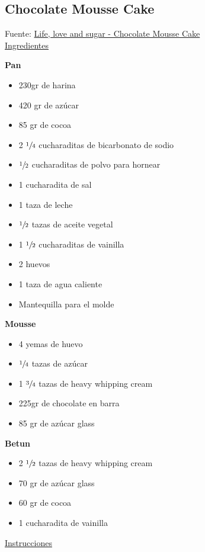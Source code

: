\subsection{Chocolate Mousse Cake}

Fuente: \href{https://www.lifeloveandsugar.com/2017/10/23/chocolate-mousse-cake/}{Life, love and sugar - Chocolate Mousse Cake}\\

\underline{Ingredientes}

\textbf{Pan}
\begin{itemize}
\item 230gr de harina
\item 420 gr de azúcar
\item 85 gr de cocoa
\item 2 $\sfrac{1}{4}$ cucharaditas de bicarbonato de sodio
\item $\sfrac{1}{2}$ cucharaditas de polvo para hornear
\item 1 cucharadita de sal
\item 1 taza de leche
\item $\sfrac{1}{2}$ tazas de aceite vegetal
\item 1 $\sfrac{1}{2}$ cucharaditas de vainilla
\item 2 huevos
\item 1 taza de agua caliente
\item Mantequilla para el molde
\end{itemize}

\textbf{Mousse}
\begin{itemize}
\item 4 yemas de huevo
\item $\sfrac{1}{4}$ tazas de azúcar
\item 1 $\sfrac{3}{4}$ tazas de heavy whipping cream
\item 225gr de chocolate en barra
\item 85 gr de azúcar glass 
\end{itemize}

\textbf{Betun}
\begin{itemize}
\item 2 $\sfrac{1}{2}$ tazas de heavy whipping cream
\item 70 gr de azúcar glass
\item 60 gr de cocoa
\item 1 cucharadita de vainilla
\end{itemize}

\underline{Instrucciones}


